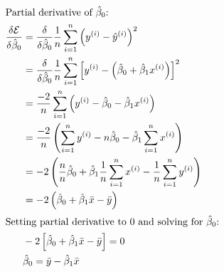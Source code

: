 \documentclass{article}
\begin{document}
\begin{align*}
	\intertext{Partial derivative of $\hat\beta_0$:}
	\frac{\delta\mathcal{E}}{\delta{\hat\beta_0}} &= \frac{\delta}{\delta{\hat\beta_0}}\frac{1}{n}\sum_{i=1}^n \left(y^{(i)} - \hat y^{(i)}\right)^2 \\
												  &= \frac{\delta}{\delta{\hat\beta_0}}\frac{1}{n}\sum_{i=1}^n \left[y^{(i)} - \left(\hat\beta_0 + \hat\beta_1 x^{(i)}\right)\right]^2 \\
												  &= \frac{-2}{n}\sum_{i=1}^n \left(y^{(i)} - \hat\beta_0 - \hat\beta_1 x^{(i)}\right)\\
												  &= \frac{-2}{n}\left(\sum_{i=1}^ny^{(i)} - n\hat\beta_0-\hat\beta_1\sum_{i=1}^nx^{(i)}\right) \\
												  &= -2\left(\frac{n}{n}\hat\beta_0+\hat\beta_1\frac{1}{n}\sum_{i=1}^nx^{(i)}-\frac{1}{n}\sum_{i=1}^ny^{(i)}\right)\\
												  &= -2\left(\hat\beta_0+\hat\beta_1\bar x-\bar y\right)\\
	\intertext{Setting partial derivative to 0 and solving for $\hat\beta_0$:}
												  &	-2\left[\hat\beta_0+\hat\beta_1\bar x-\bar y\right] = 0\\
												  &\hat\beta_0 = \bar{y} - \hat\beta_1\bar{x}
\end{align*}
\end{document}
